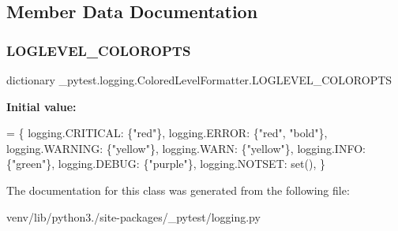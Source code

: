 \subsection{Member Data Documentation}
\mbox{\label{class__pytest_1_1logging_1_1_colored_level_formatter_a1ff0351c7660c1fc744941479117807f}} 
\subsubsection{\texorpdfstring{L\+O\+G\+L\+E\+V\+E\+L\+\_\+\+C\+O\+L\+O\+R\+O\+P\+TS}{LOGLEVEL\_COLOROPTS}}
{\footnotesize\ttfamily dictionary \+\_\+pytest.\+logging.\+Colored\+Level\+Formatter.\+L\+O\+G\+L\+E\+V\+E\+L\+\_\+\+C\+O\+L\+O\+R\+O\+P\+TS\hspace{0.3cm}{\ttfamily [static]}}

{\bfseries Initial value\+:}
\begin{DoxyCode}
=  \{
        logging.CRITICAL: \{\textcolor{stringliteral}{"red"}\},
        logging.ERROR: \{\textcolor{stringliteral}{"red"}, \textcolor{stringliteral}{"bold"}\},
        logging.WARNING: \{\textcolor{stringliteral}{"yellow"}\},
        logging.WARN: \{\textcolor{stringliteral}{"yellow"}\},
        logging.INFO: \{\textcolor{stringliteral}{"green"}\},
        logging.DEBUG: \{\textcolor{stringliteral}{"purple"}\},
        logging.NOTSET: set(),
    \}
\end{DoxyCode}


The documentation for this class was generated from the following file\+:\begin{DoxyCompactItemize}
\item 
venv/lib/python3./site-\/packages/\+\_\+pytest/logging.\+py\end{DoxyCompactItemize}
